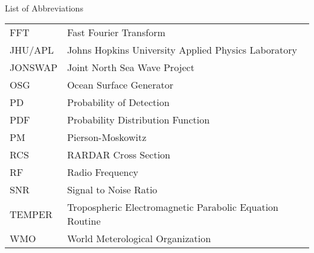 

\renewcommand{\baselinestretch}{1}
\small\normalsize
\hbox{\ }

\vspace{-4em}

\begin{center}
\large{List of Abbreviations}
\end{center} 

\vspace{3pt}

\begin{supertabular}{ll}
FFT & Fast Fourier Transform \\
JHU/APL & Johns Hopkins University Applied Physics Laboratory \\
JONSWAP & Joint North Sea Wave Project\\
OSG & Ocean Surface Generator \\
PD & Probability of Detection \\
PDF & Probability Distribution Function \\
PM & Pierson-Moskowitz \\
RCS & RARDAR Cross Section \\
RF & Radio Frequency \\
SNR & Signal to Noise Ratio\\
TEMPER & Tropospheric Electromagnetic Parabolic Equation Routine \\
WMO & World Meterological Organization \\
\end{supertabular}
